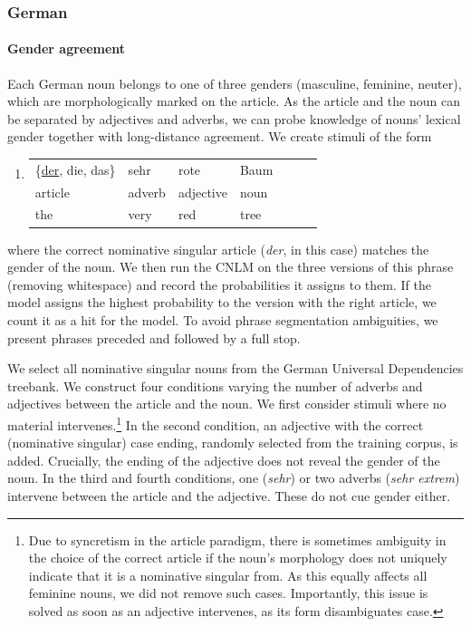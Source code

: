 \subsubsection{German}%


\paragraph{Gender agreement}
Each German noun belongs to one of three genders (masculine, feminine, neuter), which are morphologically marked on the article. As the article and the noun can be separated by adjectives and adverbs, we can probe knowledge of nouns' lexical gender together with long-distance agreement.
We create stimuli of the form
\begin{enumerate}[label={(\arabic*)}]
	\item \begin{tabular}[t]{lllllll}
	\{\underline{der}, die, das\}& sehr& rote& Baum \\
	article & adverb & adjective & noun \\
	the & very & red & tree
\end{tabular}
\end{enumerate}
where the correct nominative singular article (\emph{der}, in this case) matches the gender of the noun.
We then run the CNLM on the three versions of this phrase (removing whitespace) and record the probabilities it assigns to them. If the model assigns the highest probability to the version with the right article, we count it as a hit for the model. To avoid phrase segmentation ambiguities, we present phrases preceded and followed by a full stop.

We select all nominative singular nouns from the German Universal Dependencies treebank. %
We construct four conditions varying the number of adverbs and adjectives between the article and the noun.
We first consider stimuli where no material intervenes.\footnote{Due to syncretism in the article paradigm, there is sometimes ambiguity in the choice of the correct article if the noun's morphology does not uniquely indicate that it is a nominative singular from. As this equally affects all feminine nouns, we did not remove such cases. Importantly, this issue is solved as soon as an adjective intervenes, as its form disambiguates case.}
In the second condition, an adjective with the correct (nominative singular) case ending, randomly selected from the training corpus, is added.
Crucially, the ending of the adjective does not reveal the gender of the noun.
In the third and fourth conditions, one (\emph{sehr}) or two adverbs (\emph{sehr extrem}) intervene between the article and the adjective.
These do not cue gender either.

